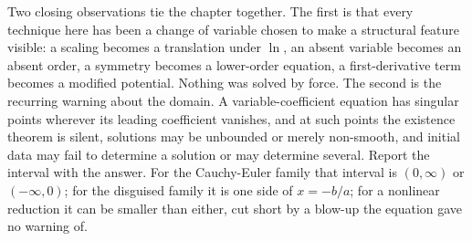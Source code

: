 Two closing observations tie the chapter together. The first is that every technique here has been a change of variable chosen to make a structural feature visible: a scaling becomes a translation under $\ln$, an absent variable becomes an absent order, a symmetry becomes a lower-order equation, a first-derivative term becomes a modified potential. Nothing was solved by force. The second is the recurring warning about the domain. A variable-coefficient equation has singular points wherever its leading coefficient vanishes, and at such points the existence theorem is silent, solutions may be unbounded or merely non-smooth, and initial data may fail to determine a solution or may determine several. Report the interval with the answer. For the Cauchy-Euler family that interval is $(0,\infty)$ or $(-\infty,0)$; for the disguised family it is one side of $x=-b/a$; for a nonlinear reduction it can be smaller than either, cut short by a blow-up the equation gave no warning of.


